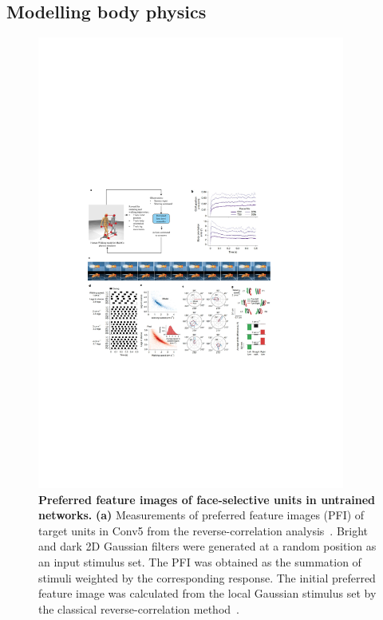 \documentclass[sn-mathphys-num]{sn-jnl}%
\theoremstyle{thmstyleone}%
\theoremstyle{thmstyletwo}%
\theoremstyle{thmstylethree}%
\begin{document}
\subsection{Modelling body physics} \label{sec:preferred}

\begin{figure}[!htb]
	\centering
	\includegraphics[width=0.9\textwidth]{fig/fig_2.pdf}
	\caption{
		\textbf{Preferred feature images of face-selective units in untrained networks.
		}
		\textbf{(a)} Measurements of preferred feature images (PFI) of target units in Conv5 from the reverse-correlation analysis~\cite{bonin2011local}.
		Bright and dark 2D Gaussian filters were generated at a random position as an input stimulus set.
		The PFI was obtained as the summation of stimuli weighted by the corresponding response.
		The initial preferred feature image was calculated from the local Gaussian stimulus set by the classical reverse-correlation method~\cite{bonin2011local}.
}
\end{figure}
\end{document}
